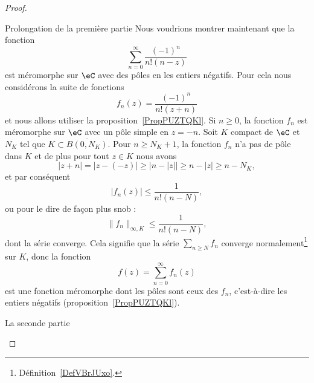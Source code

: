 \begin{proof}
\begin{subproof}
        \item[Prolongation de la première partie] Nous voudrions montrer maintenant que la fonction
            \begin{equation}
                \sum_{n=0}^{\infty}\frac{ (-1)^n }{ n!(n-z) }
            \end{equation}
            est méromorphe sur \( \eC\) avec des pôles en les entiers négatifs. Pour cela nous considérons la suite de fonctions
            \begin{equation}
                f_n(z)=\frac{ (-1)^n }{ n!(z+n) }
            \end{equation}
            et nous allons utiliser la proposition~\ref{PropPUZTQKl}. Si \( n\geq 0\), la fonction \( f_n\) est méromorphe sur \( \eC\) avec un pôle simple en \( z=-n\). Soit \( K\) compact de \( \eC\) et \( N_K\) tel que \( K\subset\overline{ B(0,N_K) }\). Pour \( n\geq N_K+1\), la fonction \( f_n\) n'a pas de pôle dans \( K\) et de plus pour tout \( z\in K\) nous avons
            \begin{equation}
                | z+n |=| z-(-z) |\geq\big| n-| z | \big|\geq n-| z |\geq n-N_K,
            \end{equation}
            et par conséquent
            \begin{equation}
                | f_n(z) |\leq \frac{1}{ n!(n-N) },
            \end{equation}
            ou pour le dire de façon plus snob :
            \begin{equation}
                \| f_n \|_{\infty,K}\leq \frac{1}{ n!(n-N) },
            \end{equation}
            dont la série converge. Cela signifie que la série \( \sum_{n\geq N}f_n\) converge normalement\footnote{Définition~\ref{DefVBrJUxo}.} sur \( K\), donc la fonction
            \begin{equation}
                f(z)=\sum_{n=0}^{\infty}f_n(z)
            \end{equation}
            est une fonction méromorphe dont les pôles sont ceux des \( f_n\), c'est-à-dire les entiers négatifs (proposition~\ref{PropPUZTQKl}).

        \item[La seconde partie]


\end{subproof}
\end{proof}
